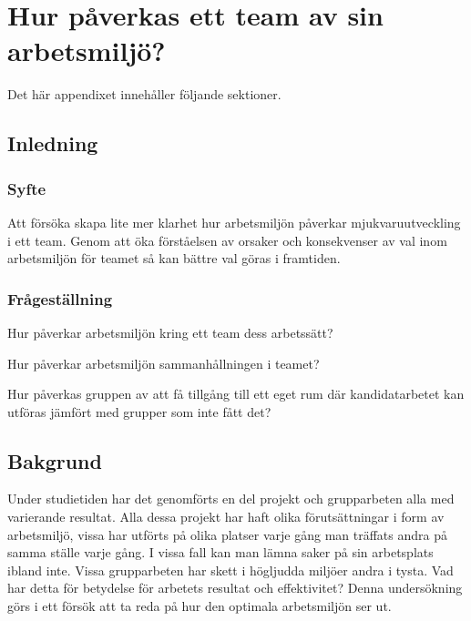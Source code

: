\chapter{Hur påverkas ett team av sin arbetsmiljö?}
\label{cha:indiv-report-person}

Det här appendixet innehåller följande sektioner.

\section{Inledning}
\label{sec:introduction-person}


\subsection{Syfte}
\label{sec:purpose-person}

Att försöka skapa lite mer klarhet hur  arbetsmiljön påverkar mjukvaruutveckling i ett team. Genom att öka förståelsen av orsaker och konsekvenser av val inom arbetsmiljön för teamet så kan bättre val göras i framtiden.

\subsection{Frågeställning}
\label{sec:issue-person}

Hur påverkar arbetsmiljön kring ett team dess arbetssätt?

Hur påverkar arbetsmiljön sammanhållningen i teamet?

Hur påverkas gruppen av att få tillgång till ett eget rum där kandidatarbetet kan utföras jämfört med grupper som inte fått det?

\section{Bakgrund}
\label{sec:background-person}

Under studietiden har det genomförts en del projekt och grupparbeten alla med varierande resultat. Alla dessa projekt har haft olika förutsättningar i form av arbetsmiljö, vissa har utförts på olika platser varje gång man träffats andra på samma ställe varje gång. I vissa fall kan man lämna saker på sin arbetsplats ibland inte. Vissa grupparbeten har skett i högljudda miljöer andra i tysta. Vad har detta för betydelse för arbetets resultat och effektivitet? Denna undersökning görs i ett försök att ta reda på hur den optimala arbetsmiljön ser ut. 

